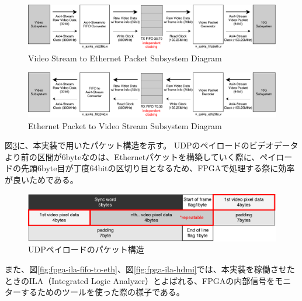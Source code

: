\begin{figure}[htbp]
    \begin{center}
        \includegraphics[bb=0 0 911 166,width=15.5cm]{img/fpga-video-ethernet-diagram.pdf}
    \end{center}
    \caption{Video Stream to Ethernet Packet Subsystem Diagram}
    \label{fig:fpga-video-ethernet-diagram}
\end{figure}

\begin{figure}[htbp]
    \begin{center}
        \includegraphics[bb=0 0 911 166,width=15.5cm]{img/fpga-ethernet-video-diagram.pdf}
    \end{center}
    \caption{Ethernet Packet to Video Stream Subsystem Diagram}
    \label{fig:fpga-ethernet-video-diagram}
\end{figure}

図\ref{fig:fpga-video-packet}に、本実装で用いたパケット構造を示す。
UDPのペイロードのビデオデータより前の区間が6byteなのは、Ethernetパケットを構築していく際に、ペイロードの先頭6byte目が丁度64bitの区切り目となるため、FPGAで処理する祭に効率が良いためである。

\begin{figure}[htbp]
    \begin{center}
        \includegraphics[bb=0 0 643 122,width=15.5cm]{img/fpga-video-packet.pdf}
    \end{center}
    \caption{UDPペイロードのパケット構造}
    \label{fig:fpga-video-packet}
\end{figure}

また、図\ref{fig:fpga-ila-fifo-to-eth}、図\ref{fig:fpga-ila-hdmi}では、本実装を稼働させたときのILA（Integrated Logic Analyzer）とよばれる、FPGAの内部信号をモニターするためのツールを使った際の様子である。

